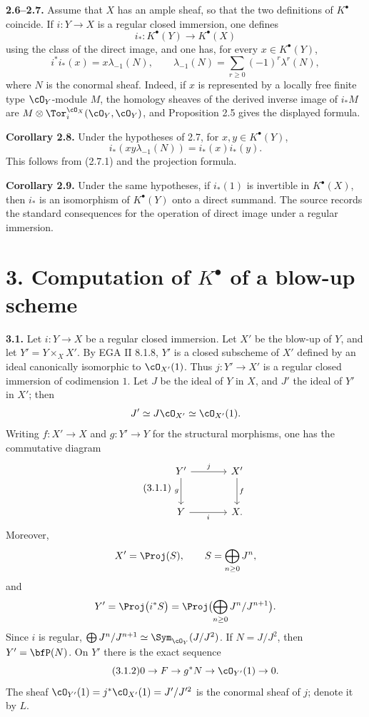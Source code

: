 \textbf{2.6--2.7.} Assume that \(X\) has an ample sheaf, so that the two definitions of \(K^\bullet\) coincide. If \(i:Y\to X\) is a regular closed immersion, one defines
\[
i_*:K^\bullet(Y)\to K^\bullet(X)
\]
using the class of the direct image, and one has, for every \(x\in K^\bullet(Y)\),
\begin{equation}\tag{2.7.1}
i^*i_*(x)=x\lambda_{-1}(N),
\qquad
\lambda_{-1}(N)=\sum_{r\ge0}(-1)^r\lambda^r(N),
\end{equation}
where \(N\) is the conormal sheaf. Indeed, if \(x\) is represented by a locally free finite type \(\cO_Y\)-module \(M\), the homology sheaves of the derived inverse image of \(i_*M\) are \(M\otimes\Tor_i^{\cO_X}(\cO_Y,\cO_Y)\), and Proposition 2.5 gives the displayed formula.

\textbf{Corollary 2.8.} Under the hypotheses of 2.7, for \(x,y\in K^\bullet(Y)\),
\begin{equation}\tag{2.8.1}
i_*(xy\lambda_{-1}(N))=i_*(x)i_*(y).
\end{equation}
This follows from (2.7.1) and the projection formula.

\textbf{Corollary 2.9.} Under the same hypotheses, if \(i_*(1)\) is invertible in \(K^\bullet(X)\), then \(i_*\) is an isomorphism of \(K^\bullet(Y)\) onto a direct summand. The source records the standard consequences for the operation of direct image under a regular immersion.

\section*{3. Computation of \texorpdfstring{$K^\bullet$}{K} of a blow-up scheme}

\textbf{3.1.} Let \(i:Y\to X\) be a regular closed immersion. Let \(X'\) be the blow-up of \(Y\), and let \(Y'=Y\times_X X'\). By EGA II 8.1.8, \(Y'\) is a closed subscheme of \(X'\) defined by an ideal canonically isomorphic to \(\cO_{X'}(1)\). Thus \(j:Y'\to X'\) is a regular closed immersion of codimension \(1\). Let \(J\) be the ideal of \(Y\) in \(X\), and \(J'\) the ideal of \(Y'\) in \(X'\); then
\[
J'\simeq J\cO_{X'}\simeq\cO_{X'}(1).
\]
Writing \(f:X'\to X\) and \(g:Y'\to Y\) for the structural morphisms, one has the commutative diagram
\begin{equation}\tag{3.1.1}
\begin{tikzcd}[column sep=large,row sep=large]
Y' \arrow[r,"j"] \arrow[d,"g"'] & X' \arrow[d,"f"]\\
Y \arrow[r,"i"'] & X.
\end{tikzcd}
\end{equation}
Moreover,
\[
X'=\Proj(S),\qquad S=\bigoplus_{n\ge0}J^n,
\]
and
\[
Y'=\Proj\bigl(i^*S\bigr)
=\Proj\bigl(\bigoplus_{n\ge0}J^n/J^{n+1}\bigr).
\]
Since \(i\) is regular, \(\bigoplus J^n/J^{n+1}\simeq\Sym_{\cO_Y}(J/J^2)\). If \(N=J/J^2\), then \(Y'=\bfP(N)\). On \(Y'\) there is the exact sequence
\begin{equation}\tag{3.1.2}
0\to F\to g^*N\to\cO_{Y'}(1)\to0.
\end{equation}
The sheaf \(\cO_{Y'}(1)=j^*\cO_{X'}(1)=J'/J'^2\) is the conormal sheaf of \(j\); denote it by \(L\).

